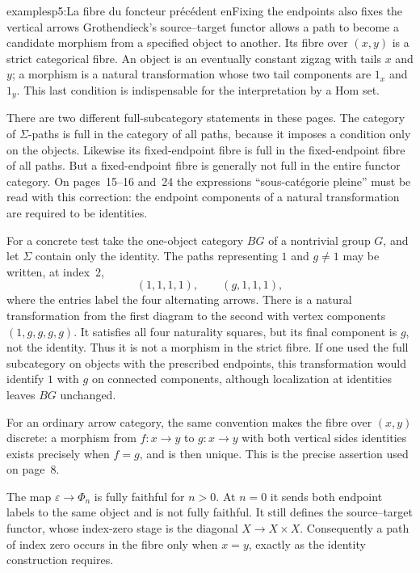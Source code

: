 \begin{dcomment}{examples}{p5:La fibre du foncteur précédent en}{Fixing the endpoints also fixes the vertical arrows}
Grothendieck's source--target functor allows a path to become a candidate morphism from a specified object to another. Its fibre over $(x,y)$ is a strict categorical fibre. An object is an eventually constant zigzag with tails $x$ and $y$; a morphism is a natural transformation whose two tail components are $1_x$ and $1_y$. This last condition is indispensable for the interpretation by a Hom set.

There are two different full-subcategory statements in these pages. The category of $\Sigma$-paths is full in the category of all paths, because it imposes a condition only on the objects. Likewise its fixed-endpoint fibre is full in the fixed-endpoint fibre of all paths. But a fixed-endpoint fibre is generally not full in the entire functor category. On pages~15--16 and~24 the expressions ``sous-cat\'egorie pleine'' must be read with this correction: the endpoint components of a natural transformation are required to be identities.

For a concrete test take the one-object category $BG$ of a nontrivial group $G$, and let $\Sigma$ contain only the identity. The paths representing $1$ and $g\ne1$ may be written, at index~2,
\[
 (1,1,1,1),\qquad (g,1,1,1),
\]
where the entries label the four alternating arrows. There is a natural transformation from the first diagram to the second with vertex components $(1,g,g,g,g)$. It satisfies all four naturality squares, but its final component is $g$, not the identity. Thus it is not a morphism in the strict fibre. If one used the full subcategory on objects with the prescribed endpoints, this transformation would identify $1$ with $g$ on connected components, although localization at identities leaves $BG$ unchanged.

For an ordinary arrow category, the same convention makes the fibre over $(x,y)$ discrete: a morphism from $f:x\to y$ to $g:x\to y$ with both vertical sides identities exists precisely when $f=g$, and is then unique. This is the precise assertion used on page~8.

The map $\varepsilon\to\Phi_n$ is fully faithful for $n>0$. At $n=0$ it sends both endpoint labels to the same object and is not fully faithful. It still defines the source--target functor, whose index-zero stage is the diagonal $X\to X\times X$. Consequently a path of index zero occurs in the fibre only when $x=y$, exactly as the identity construction requires.
\end{dcomment}

